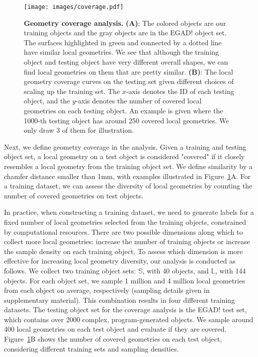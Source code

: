 \begin{figure}[t]
    \centering
    \texttt{[image: images/coverage.pdf]}
    \caption{\textbf{Geometry coverage analysis.} \textbf{(A)}: The colored objects are our training objects and the gray objects are in the EGAD! object set. The surfaces highlighted in green and connected by a dotted line have similar local geometries. We see that although the training object and testing object have very different overall shapes, we can find local geometries on them that are pretty similar. \textbf{(B)}: The local geometry coverage curves on the testing set given different choices of scaling up the training set. The $x$-axis denotes the ID of each testing object, and the $y$-axis denotes the number of covered local geometries on each testing object. An example is given where the 1000-th testing object has around 250 covered local geometries. We only draw 3 of them for illustration.
    }
    \label{fig:coverage}
\end{figure}

Next, we define geometry coverage in the analysis. Given a training and testing object set, a local geometry on a test object is considered "covered" if it closely resembles a local geometry from the training object set. We define similarity by a chamfer distance smaller than 1mm, with examples illustrated in Figure~\ref{fig:coverage}A. For a training dataset, we can assess the diversity of local geometries by counting the number of covered geometries on test objects.

In practice, when constructing a training dataset, we need to generate labels for a fixed number of local geometries selected from the training objects, constrained by computational resources. There are two possible dimensions  along which to collect more local geometries: increase the number of training objects or increase the sample density on each training object. To assess which dimension is more effective for increasing local geometry diversity, our analysis is conducted as follows. We collect two training object sets: $\mathbb{S}$, with 40 objects, and $\mathbb{L}$, with 144 objects. For each object set, we sample 1 million and 4 million local geometries from each object on average, respectively (sampling details given in supplementary material). This combination results in four different training datasets. The testing object set for the coverage analysis is the EGAD! test set, which contains over 2000 complex, program-generated objects. We sample around 400 local geometries on each test object and evaluate if they are covered. Figure~\ref{fig:coverage}B shows the number of covered geometries on each test object, considering different training sets and sampling densities. 

